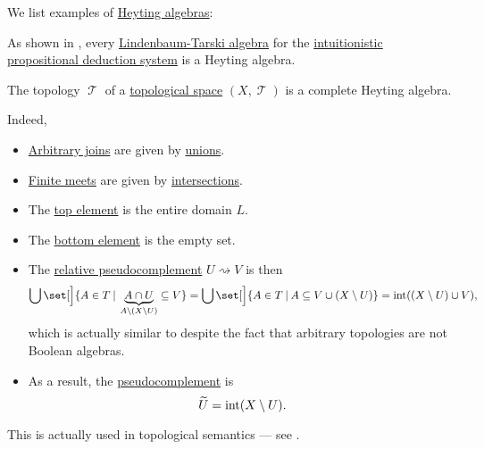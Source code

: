 \begin{example}\label{ex:def:heyting_algebra}
  We list examples of \hyperref[def:heyting_algebra]{Heyting algebras}:
  \begin{thmenum}
     As shown in , every \hyperref[def:lindenbaum_tarski_algebra]{Lindenbaum-Tarski algebra} for the \hyperref[def:intuitionistic_propositional_deductive_systems]{intuitionistic propositional deduction system} is a Heyting algebra.

     The topology \( \mscrT \) of a \hyperref[def:topological_space]{topological space} \( (X, \mscrT) \) is a complete Heyting algebra.

    Indeed,
    \begin{itemize}
      \item \hyperref[def:lattice/join]{Arbitrary joins} are given by \hyperref[def:basic_set_operations/union]{unions}.
      \item \hyperref[def:lattice/meet]{Finite meets} are given by \hyperref[def:basic_set_operations/intersection]{intersections}.
      \item The \hyperref[def:extremal_points/top_and_bottom]{top element} is the entire domain \( L \).
      \item The \hyperref[def:extremal_points/top_and_bottom]{bottom element} is the empty set.
      \item The \hyperref[def:heyting_algebra]{relative pseudocomplement} \( U \rightsquigarrow V \) is then
      \begin{equation*}
        \bigcup\set[\Big]{ A \in T \given \underbrace{A \cap U}_{A \setminus (X \setminus U)} \subseteq V }
        =
        \bigcup\set[\Big]{ A \in T \given A \subseteq V \cup (X \setminus U) }
        =
        \Int((X \setminus U) \cup V),
      \end{equation*}
      which is actually similar to  despite the fact that arbitrary topologies are not Boolean algebras.

      \item As a result, the \hyperref[def:heyting_algebra/pseudocomplement]{pseudocomplement} is
      \begin{equation*}
        \widetilde U = \operatorname{int}(X \setminus U).
      \end{equation*}
    \end{itemize}

    This is actually used in topological semantics --- see .
  \end{thmenum}
\end{example}

